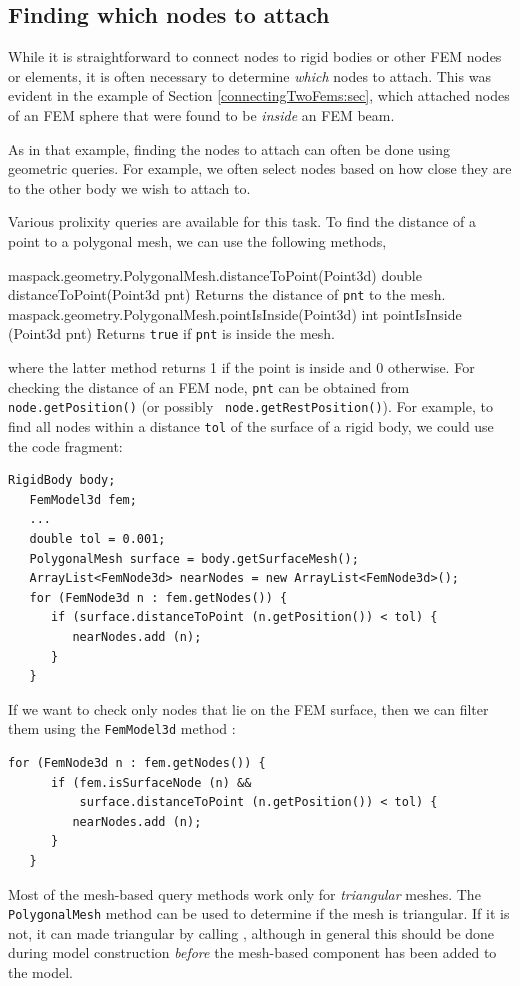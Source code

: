 \subsection{Finding which nodes to attach}

While it is straightforward to connect nodes to rigid bodies or other
FEM nodes or elements, it is often necessary to determine {\it which}
nodes to attach. This was evident in the example of
Section \ref{connectingTwoFems:sec}, which attached nodes of an FEM
sphere that were found to be {\it inside} an FEM beam.

As in that example, finding the nodes to attach can often be done
using geometric queries. For example, we often select nodes based on
how close they are to the other body we wish to attach to.

Various prolixity queries are available for this task. To find the
distance of a point to a polygonal mesh, we can use the
following  methods,
%
%
\begin{methodtable}[4pt]{0.5}{0.5}
\midline
%
\methodentry
{maspack.geometry.PolygonalMesh.distanceToPoint(Point3d)}%
{double distanceToPoint(Point3d pnt)}%
{Returns the distance of {\tt pnt} to the mesh.}%
%
\methodentry
{maspack.geometry.PolygonalMesh.pointIsInside(Point3d)}%
{int pointIsInside (Point3d pnt)}%
{Returns {\tt true} if {\tt pnt} is inside the mesh.}%
%
\midline
\end{methodtable}
%
where the latter method returns 1 if the point is inside and 0
otherwise. For checking the distance of an FEM node, {\tt pnt} can be obtained
from {\tt node.getPosition()} (or possibly {\tt
node.getRestPosition()}). For example,
to find all nodes within a distance {\tt tol} of the surface
of a rigid body, we could use the code fragment:
%
\begin{lstlisting}[]
   RigidBody body;
   FemModel3d fem;
   ...
   double tol = 0.001;
   PolygonalMesh surface = body.getSurfaceMesh();
   ArrayList<FemNode3d> nearNodes = new ArrayList<FemNode3d>();
   for (FemNode3d n : fem.getNodes()) {
      if (surface.distanceToPoint (n.getPosition()) < tol) {
         nearNodes.add (n);
      }
   }
\end{lstlisting}
%
If we want to check only nodes that lie on the FEM surface, then we
can filter them using the {\tt FemModel3d}
method :
%
\begin{lstlisting}[]
   for (FemNode3d n : fem.getNodes()) {
      if (fem.isSurfaceNode (n) &&
          surface.distanceToPoint (n.getPosition()) < tol) {
         nearNodes.add (n);
      }
   }
\end{lstlisting}
%
\begin{sideblock}
Most of the mesh-based query methods work only for {\it triangular}
meshes. The {\tt PolygonalMesh} method
can be used to determine if the mesh is triangular. If it
is not, it can made triangular by calling
,
although in general this should be done during model construction {\it
before} the mesh-based component has been added to the model.
\end{sideblock}

